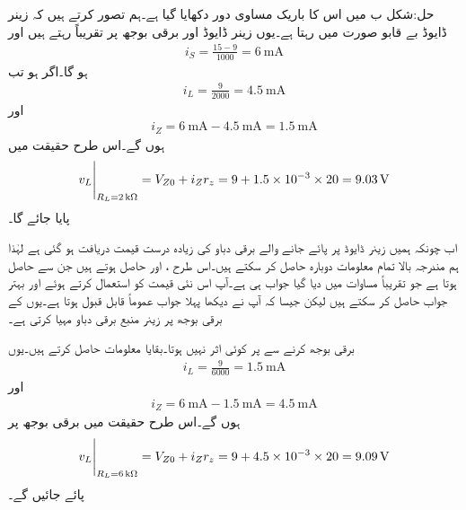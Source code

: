 حل:شکل  ب میں اس کا باریک مساوی دور دکھایا گیا ہے۔ہم تصور کرتے ہیں کہ زینر ڈایوڈ بے قابو صورت میں رہتا ہے۔یوں زینر ڈایوڈ اور برقی بوجھ پر تقریباً  رہتے ہیں اور
\begin{align*}
i_S=\frac{15-9}{1000}=\SI{6}{\milli \ampere}
\end{align*}
ہو گا۔اگر  ہو تب
\begin{align*}
i_L=\frac{9}{2000}=\SI{4.5}{\milli \ampere}
\end{align*}
اور
\begin{align*}
i_Z=\SI{6}{\milli \ampere}-\SI{4.5}{\milli \ampere}=\SI{1.5}{\milli \ampere}
\end{align*}
ہوں گے۔اس طرح حقیقت میں
\begin{align}\label{مساوات_ڈایوڈ_زینر_منبع_جواب}
\eval{v_{L}}_{R_L=\SI{2}{\kilo \ohm}}=V_{Z0}+i_Z r_z=9+1.5 \times 10^{-3} \times 20=\SI{9.03}{\volt}
\end{align}
پایا جائے گا۔

اب چونکہ ہمیں زینر ڈایوڈ پر پائے جانے والے برقی دباو کی زیادہ درست قیمت دریافت ہو گئی ہے لہٰذا ہم مندرجہ بالا تمام معلومات دوبارہ حاصل کر سکتے  ہیں۔اس طرح ،   اور  حاصل ہوتے ہیں جن سے  حاصل ہوتا ہے جو تقریباً مساوات  میں دیا گیا جواب ہی ہے۔آپ اس نئی قیمت کو استعمال کرتے ہوئے اور بہتر جواب حاصل کر سکتے ہیں لیکن جیسا کہ آپ نے دیکھا پہلا جواب عموماً قابل قبول ہوتا ہے۔یوں  کے برقی بوجھ پر زینر منبع  برقی دباو مہیا کرتی ہے۔

برقی بوجھ  کرنے سے  پر کوئی اثر نہیں ہوتا۔بقایا معلومات حاصل کرتے ہیں۔یوں
\begin{align*}
i_L=\frac{9}{6000}=\SI{1.5}{\milli \ampere}
\end{align*}
اور
\begin{align*}
i_Z=\SI{6}{\milli \ampere}-\SI{1.5}{\milli \ampere}=\SI{4.5}{\milli \ampere}
\end{align*}
ہوں گے۔اس طرح حقیقت میں برقی بوجھ پر
\begin{align}\label{مساوات_ڈایوڈ_زینر_منبع_جواب_الف}
\eval{v_{L}}_{R_L=\SI{6}{\kilo \ohm}}=V_{Z0}+i_Z r_z=9+4.5 \times 10^{-3} \times 20=\SI{9.09}{\volt}
\end{align}
پائے جائیں گے۔

